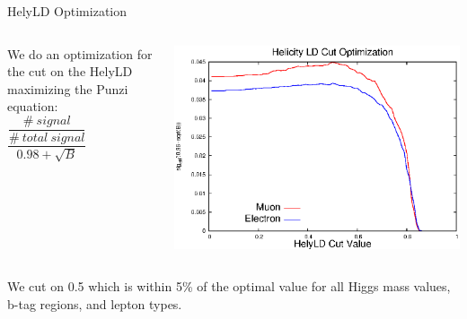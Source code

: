 \begin{frame}{HelyLD Optimization}

  \begin{columns}
    \begin{column}{0.3\textwidth}
        We do an optimization for the cut on the HelyLD maximizing the Punzi equation:\\ 
        \vspace{1em}
        $\dfrac{\dfrac{\#\ signal}{\#\ total\ signal}}{0.98 + \sqrt{B}}$
    \end{column}
    \begin{column}{0.7\textwidth}
      \includegraphics[width=0.99\linewidth]{images/hely_optimization.eps}
    \end{column}
  \end{columns}
\begin{center}
We cut on 0.5 which is within 5\% of the optimal value for all Higgs mass values, b-tag regions, and lepton types.
\end{center}
\end{frame}








